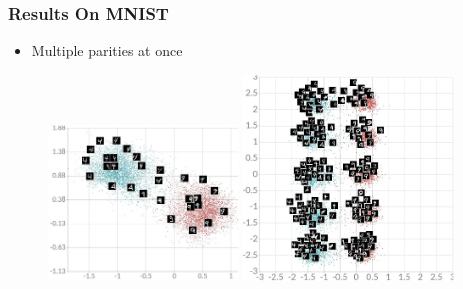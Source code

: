 \documentclass[10pt]{beamer}
\begin{document}
\begin{frame}
    \frametitle{Results On MNIST}
    \begin{itemize}
        \item Multiple parities at once
    \end{itemize}


    \begin{figure}[h]
        \begin{center}
            \includegraphics[width=0.45\textwidth]{figures/our_mnist.jpg}
            \vspace{1cm}
            \includegraphics[width=0.5\textwidth]{../report/thesis_figures/mnist_cl2d2.jpg}
        \end{center}
    \end{figure}
\end{frame}
\end{document}
